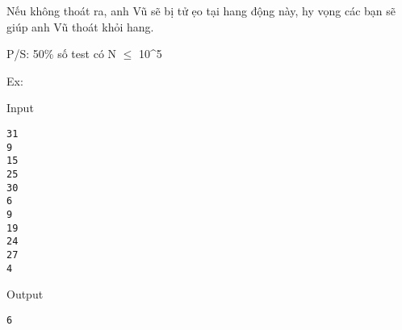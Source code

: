    Nếu không thoát ra, anh Vũ sẽ bị tử ẹo tại hang động này, hy vọng các bạn sẽ giúp anh Vũ thoát khỏi hang.  



            P/S:                50\% số test có N $\le$ 10\textasciicircum5  



            Ex:         



   Input  




\begin{verbatim}
31
9
15
25
30
6
9
19
24
27
4\end{verbatim}





   Output  




\begin{verbatim}
6\end{verbatim}


